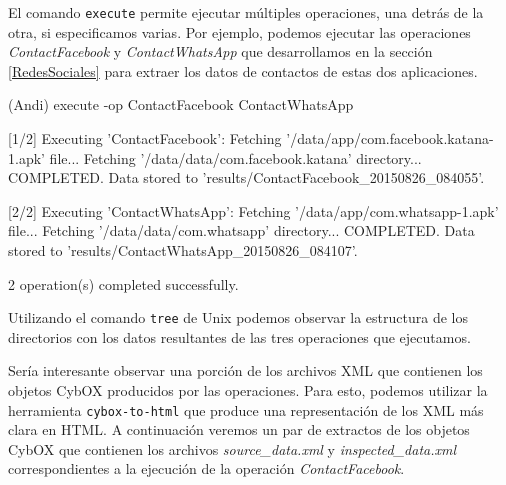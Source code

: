 El comando \texttt{execute} permite ejecutar múltiples operaciones, una detrás de la otra, si especificamos varias. Por ejemplo, podemos ejecutar las operaciones \emph{ContactFacebook} y \emph{ContactWhatsApp} que desarrollamos en la sección \ref{RedesSociales} para extraer los datos de contactos de estas dos aplicaciones.
\newline

\begin{bash}
(Andi) execute -op ContactFacebook ContactWhatsApp

[1/2] Executing 'ContactFacebook': 
Fetching '/data/app/com.facebook.katana-1.apk' file...
Fetching '/data/data/com.facebook.katana' directory...
COMPLETED. Data stored to 'results/ContactFacebook_20150826_084055'.

[2/2] Executing 'ContactWhatsApp': 
Fetching '/data/app/com.whatsapp-1.apk' file...
Fetching '/data/data/com.whatsapp' directory...
COMPLETED. Data stored to 'results/ContactWhatsApp_20150826_084107'.

2 operation(s) completed successfully.
\end{bash}

Utilizando el comando \texttt{tree} de Unix podemos observar la estructura de los directorios con los datos resultantes de las tres operaciones que ejecutamos.
\newline


Sería interesante observar una porción de los archivos XML que contienen los objetos CybOX producidos por las operaciones. Para esto, podemos utilizar la herramienta \texttt{cybox-to-html} \cite{stix-to-html} que produce una representación de los XML más clara en HTML. A continuación veremos un par de extractos de los objetos CybOX que contienen los archivos \emph{source\_data.xml} y \emph{inspected\_data.xml} correspondientes a la ejecución de la operación \emph{ContactFacebook}.


